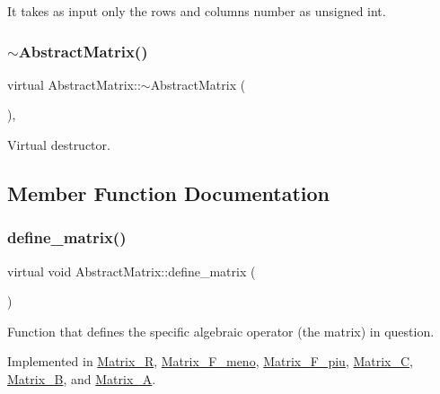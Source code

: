 It takes as input only the rows\textquotesingle{} and columns\textquotesingle{} number as unsigned int. \mbox{\label{classAbstractMatrix_ae04267719092a2174faa32054fdf079e}} 
\subsubsection{\texorpdfstring{$\sim$\+Abstract\+Matrix()}{~AbstractMatrix()}}
{\footnotesize\ttfamily virtual Abstract\+Matrix\+::$\sim$\+Abstract\+Matrix (\begin{DoxyParamCaption}{ }\end{DoxyParamCaption})\hspace{0.3cm}{\ttfamily [virtual]}, {\ttfamily [default]}}

Virtual destructor. 

\subsection{Member Function Documentation}
\mbox{\label{classAbstractMatrix_a40016da151226fbfcd444839943d8fe3}} 
\subsubsection{\texorpdfstring{define\+\_\+matrix()}{define\_matrix()}}
{\footnotesize\ttfamily virtual void Abstract\+Matrix\+::define\+\_\+matrix (\begin{DoxyParamCaption}{ }\end{DoxyParamCaption})\hspace{0.3cm}{\ttfamily [pure virtual]}}

Function that defines the specific algebraic operator (the matrix) in question. 

Implemented in \hyperlink{classMatrix__R_a311aefa7be3bbb741d1958e840bc4613}{Matrix\+\_\+R}, \hyperlink{classMatrix__F__meno_a3b660526da87f63e6091cf4422385d94}{Matrix\+\_\+\+F\+\_\+meno}, \hyperlink{classMatrix__F__piu_a137056684d91ecfac671f22518780d47}{Matrix\+\_\+\+F\+\_\+piu}, \hyperlink{classMatrix__C_a062ab76d181505d1db2e391f02152376}{Matrix\+\_\+C}, \hyperlink{classMatrix__B_a996a421d226769d39583f228d0ce0f00}{Matrix\+\_\+B}, and \hyperlink{classMatrix__A_aabd70de6bdf8e08a0a71c81b4c37554f}{Matrix\+\_\+A}.

